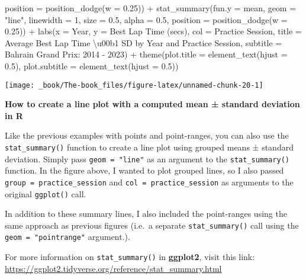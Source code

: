 \documentclass[
]{book}
\newenvironment{Shaded}{\begin{snugshade}}{\end{snugshade}}
\newcommand{\AttributeTok}[1]{\textcolor[rgb]{0.77,0.63,0.00}{#1}}
\newcommand{\DecValTok}[1]{\textcolor[rgb]{0.00,0.00,0.81}{#1}}
\newcommand{\FloatTok}[1]{\textcolor[rgb]{0.00,0.00,0.81}{#1}}
\newcommand{\FunctionTok}[1]{\textcolor[rgb]{0.00,0.00,0.00}{#1}}
\newcommand{\NormalTok}[1]{#1}
\newcommand{\SpecialCharTok}[1]{\textcolor[rgb]{0.00,0.00,0.00}{#1}}
\newcommand{\StringTok}[1]{\textcolor[rgb]{0.31,0.60,0.02}{#1}}
\begin{document}
\begin{Shaded}
\begin{Highlighting}[]
               \AttributeTok{position =} \FunctionTok{position\_dodge}\NormalTok{(}\AttributeTok{w =} \FloatTok{0.25}\NormalTok{)) }\SpecialCharTok{+}
  \FunctionTok{stat\_summary}\NormalTok{(}\AttributeTok{fun.y =}\NormalTok{ mean,}
               \AttributeTok{geom =} \StringTok{"line"}\NormalTok{, }
               \AttributeTok{linewidth =} \DecValTok{1}\NormalTok{, }\AttributeTok{size =} \FloatTok{0.5}\NormalTok{, }\AttributeTok{alpha =} \FloatTok{0.5}\NormalTok{,}
               \AttributeTok{position =} \FunctionTok{position\_dodge}\NormalTok{(}\AttributeTok{w =} \FloatTok{0.25}\NormalTok{)) }\SpecialCharTok{+}
  \FunctionTok{labs}\NormalTok{(}\AttributeTok{x =} \StringTok{\textquotesingle{}Year\textquotesingle{}}\NormalTok{,}
       \AttributeTok{y =} \StringTok{\textquotesingle{}Best Lap Time (secs)\textquotesingle{}}\NormalTok{,}
       \AttributeTok{col =} \StringTok{\textquotesingle{}Practice Session\textquotesingle{}}\NormalTok{,}
       \AttributeTok{title =} \StringTok{\textquotesingle{}Average Best Lap Time \textbackslash{}u00b1 SD by Year and Practice Session\textquotesingle{}}\NormalTok{,}
       \AttributeTok{subtitle =} \StringTok{\textquotesingle{}Bahrain Grand Prix: 2014 {-} 2023\textquotesingle{}}\NormalTok{) }\SpecialCharTok{+}
  \FunctionTok{theme}\NormalTok{(}\AttributeTok{plot.title =} \FunctionTok{element\_text}\NormalTok{(}\AttributeTok{hjust =} \FloatTok{0.5}\NormalTok{),}
        \AttributeTok{plot.subtitle =} \FunctionTok{element\_text}\NormalTok{(}\AttributeTok{hjust =} \FloatTok{0.5}\NormalTok{))}
\end{Highlighting}
\end{Shaded}

\begin{center}\texttt{[image: \_book/The-book\_files/figure-latex/unnamed-chunk-20-1]} \end{center}

\begin{blackbox}

\begin{center}
\textbf{How to create a line plot with a computed mean ± standard deviation in R}

\end{center}

Like the previous examples with points and point-ranges, you can also use the \texttt{stat\_summary()} function to create a line plot using grouped means ± standard deviation. Simply pass \texttt{geom\ =\ "line"} as an argument to the \texttt{stat\_summary()} function. In the figure above, I wanted to plot grouped lines, so I also passed \texttt{group\ =\ practice\_session} and \texttt{col\ =\ practice\_session} as arguments to the original \texttt{ggplot()} call.

In addition to these summary lines, I also included the point-ranges using the same approach as previous figures (i.e.~a separate \texttt{stat\_summary()} call using the \texttt{geom\ =\ "pointrange"} argument.).

For more information on \texttt{stat\_summary()} in \textbf{ggplot2}, visit this link: \url{https://ggplot2.tidyverse.org/reference/stat_summary.html}

\end{blackbox}
\end{document}
